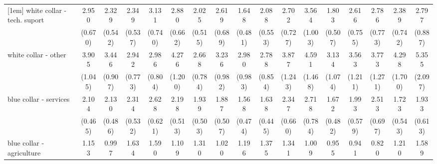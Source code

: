 {\begin{tabular}{l*{16}{c}}
[1em]
white collar - tech. suport&       2.950\sym{***}&       2.329\sym{***}&       2.349\sym{***}&       3.131\sym{***}&       2.880\sym{***}&       2.025\sym{**} &       2.619\sym{***}&       1.648         &       2.088\sym{**} &       2.702\sym{***}&       3.564\sym{***}&       1.803\sym{*}  &       2.616\sym{***}&       2.786\sym{***}&       2.389\sym{**} &       2.797\sym{**} \\
                    &     (0.670)         &     (0.542)         &     (0.537)         &     (0.740)         &     (0.662)         &     (0.515)         &     (0.689)         &     (0.481)         &     (0.553)         &     (0.727)         &     (1.003)         &     (0.507)         &     (0.755)         &     (0.773)         &     (0.742)         &     (0.887)         \\
[1em]
white collar - other&       3.905\sym{***}&       3.446\sym{***}&       2.942\sym{***}&       2.986\sym{***}&       4.276\sym{***}&       2.668\sym{***}&       3.236\sym{***}&       2.980\sym{***}&       2.788\sym{***}&       3.877\sym{***}&       4.591\sym{***}&       3.134\sym{***}&       3.563\sym{***}&       3.773\sym{***}&       4.298\sym{***}&       5.355\sym{***}\\
                    &     (1.045)         &     (0.907)         &     (0.773)         &     (0.804)         &     (1.200)         &     (0.784)         &     (0.982)         &     (0.983)         &     (0.854)         &     (1.243)         &     (1.468)         &     (1.074)         &     (1.211)         &     (1.271)         &     (1.700)         &     (2.097)         \\
[1em]
blue collar - services&       2.104\sym{***}&       2.130\sym{***}&       2.314\sym{***}&       2.628\sym{***}&       2.198\sym{***}&       1.939\sym{*}  &       1.887\sym{*}  &       1.568         &       1.638         &       2.347\sym{**} &       2.718\sym{***}&       1.672         &       1.993\sym{*}  &       2.513\sym{***}&       1.723         &       1.933\sym{*}  \\
                    &     (0.465)         &     (0.486)         &     (0.532)         &     (0.621)         &     (0.513)         &     (0.503)         &     (0.507)         &     (0.474)         &     (0.445)         &     (0.660)         &     (0.784)         &     (0.482)         &     (0.579)         &     (0.697)         &     (0.543)         &     (0.613)         \\
[1em]
blue collar - agriculture&       1.153         &       0.997         &       1.634         &       1.590         &       1.109         &       1.310         &       1.020         &       1.196         &       1.375         &       1.341         &       1.009         &       0.955         &       0.941         &       0.820         &       1.210         &       1.589         \\

\end{tabular}}
